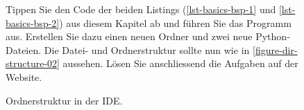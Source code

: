 \begin{figure}[htb]
\centering
\begin{minipage}{0.35\textwidth}
\centering
{}
\caption{Ordnerstruktur in der \ac{IDE}.}
\label{figure-dir-structure-02}
\end{minipage}
\hfill
\begin{minipage}{0.45\textwidth}
\centering
	\begin{important}
	Tippen Sie den Code der beiden Listings (\autoref{lst-basics-bsp-1} und \autoref{lst-basics-bsp-2}) aus diesem Kapitel ab und führen Sie das Programm aus. Erstellen Sie dazu einen neuen Ordner und zwei neue Python-Dateien. Die Datei- und Ordnerstruktur sollte nun wie in \autoref{figure-dir-structure-02} aussehen. Lösen Sie anschliessend die Aufgaben auf der Website.
	\end{important}
\end{minipage}
\end{figure}